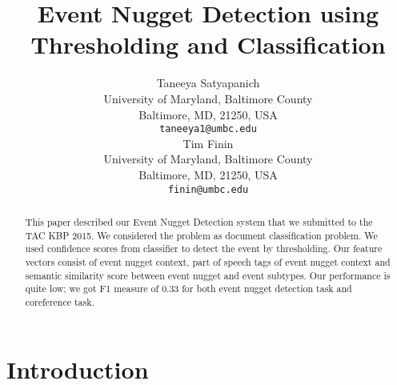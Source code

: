 \documentclass[11pt]{article}
\title{
Event Nugget Detection using Thresholding and Classification
}
\author{Taneeya Satyapanich  \\
  University of Maryland, Baltimore County \\
  Baltimore, MD, 21250, USA \\
  {\tt taneeya1@umbc.edu} \\\And
  Tim Finin \\
  University of Maryland, Baltimore County \\
  Baltimore, MD, 21250, USA \\
  {\tt finin@umbc.edu} \\}
\date{}
\begin{document}
\maketitle
\begin{abstract}
  This paper described our Event Nugget Detection  system that we submitted to the TAC KBP 2015. We considered the problem as document classification problem. We used confidence scores from classifier to detect the event by thresholding. Our feature vectors consist of event nugget context, part of speech tags of event nugget context and semantic similarity score between event nugget and event subtypes. Our performance is quite low; we got F1 measure of 0.33 for both event nugget detection task and coreference task.
\end{abstract}

\section{Introduction}
\end{document}
